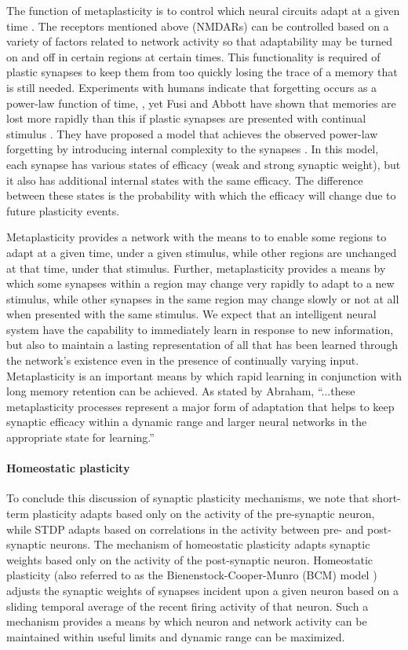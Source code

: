 \documentclass[twocolumn]{article}
\begin{document}
The function of metaplasticity is to control which neural circuits adapt at a given time \cite{ab2008}. The receptors mentioned above (NMDARs) can be controlled based on a variety of factors related to network activity so that adaptability may be turned on and off in certain regions at certain times. This functionality is required of plastic synapses to keep them from too quickly losing the trace of a memory that is still needed. Experiments with humans indicate that forgetting occurs as a power-law function of time, \cite{wieb1991,wieb1997}, yet Fusi and Abbott have shown that memories are lost more rapidly than this if plastic synapses are presented with continual stimulus \cite{fuab2007}. They have proposed a model that achieves the observed power-law forgetting by introducing internal complexity to the synapses \cite{fudr2005}. In this model, each synapse has various states of efficacy (weak and strong synaptic weight), but it also has additional internal states with the same efficacy. The difference between these states is the probability with which the efficacy will change due to future plasticity events. 

Metaplasticity provides a network with the means to to enable some regions to adapt at a given time, under a given stimulus, while other regions are unchanged at that time, under that stimulus. Further, metaplasticity provides a means by which some synapses within a region may change very rapidly to adapt to a new stimulus, while other synapses in the same region may change slowly or not at all when presented with the same stimulus. We expect that an intelligent neural system have the capability to immediately learn in response to new information, but also to maintain a lasting representation of all that has been learned through the network's existence even in the presence of continually varying input. Metaplasticity is an important means by which rapid learning in conjunction with long memory retention can be achieved. As stated by Abraham, ``...these metaplasticity processes represent a major form of adaptation that helps to keep synaptic efficacy within a dynamic range and larger neural networks in the appropriate state for learning.''

\paragraph{Homeostatic plasticity}
To conclude this discussion of synaptic plasticity mechanisms, we note that short-term plasticity adapts based only on the activity of the pre-synaptic neuron, while STDP adapts based on correlations in the activity between pre- and post-synaptic neurons. The mechanism of homeostatic plasticity \cite{cube2012} adapts synaptic weights based only on the activity of the post-synaptic neuron. Homeostatic plasticity (also referred to as the Bienenstock-Cooper-Munro (BCM) model \cite{bico1982}) adjusts the synaptic weights of synapses incident upon a given neuron based on a sliding temporal average of the recent firing activity of that neuron. Such a mechanism provides a means by which neuron and network activity can be maintained within useful limits and dynamic range can be maximized.
\end{document}
